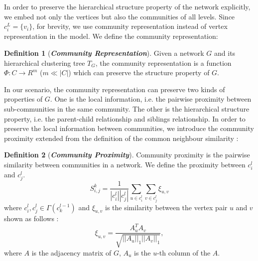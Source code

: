 \documentclass{article}
\theoremstyle{definition}
\newtheorem{defn}{Definition}
\newcommand{\origin}[1]{{\color{blue}{#1}}}
\begin{document}
		In order to preserve the hierarchical structure property of the network explicitly, we embed not only the vertices but also the communities of all levels. Since $c_i^L = \{v_i\}$, 
		for brevity, we use community representation instead of vertex representation in the model. We define the community representation:
		\begin{defn}[\textbf{\emph{Community Representation}}]
			Given a network $G$ and its hierarchical clustering tree $T_G$, the community representation is a function $\Phi: C \rightarrow R^m$ ($m \ll |C|$) which can preserve the structure property of $G$.
		\end{defn} 
	    In our scenario, the community representation can preserve two kinds of properties of $G$. One is the local information, i.e. the pairwise proximity between sub-communities in the same community.
	    The other is the hierarchical structure property, i.e. the parent-child relationship and siblings relationship.
	    In order to preserve the local information between communities, we introduce the community proximity extended from the definition of the common neighbour similarity \cite{libennowell2007the}:
	    \begin{defn}[\textbf{\emph{Community Proximity}}]
			Community proximity is the pairwise similarity between communities in a network. 
			We define the proximity between $c^l_i$ and $c^l_j$.
			\begin{equation}
			S_{i,j}^k = \frac{1}{|c_i^l||c_j^l|}\sum_{u \in c_i^l} \sum_{v \in c_j^l} \xi_{u, v}
			\end{equation} 
			where $c_i^l, c_j^l \in \Gamma(c_k^{l-1})$
			and $\xi_{u, v}$ is the similarity between the vertex pair $u$ and $v$ shown as follows :
			\begin{equation}
			\xi_{u,v} = \frac{A_u^TA_v}{\sqrt{||A_u||_1||A_v||_1}},
			\end{equation}
			where $A$ is the adjacency matrix of $G$, $A_u$ is the $u$-th column of the $A$.	
		\end{defn}
\end{document}
